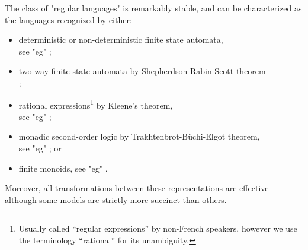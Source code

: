 The class of "regular languages" is remarkably stable, and can be characterized as the 
languages recognized by either:
\begin{itemize}
	\item deterministic or non-deterministic finite state automata,\\
		\null\hspace{1.0pc}see "eg" \cite[Proposition~1.2.3, p.~7]{Pin2021FiniteAutomata};
	\item two-way finite state automata by Shepherdson-Rabin-Scott theorem\\
		\null\hspace{1.0pc}\cite[Theorem~2, p.~198]{Shepherdson1959ReductionTwoWay}
		\cite[Theorem~15, p.~123]{RabinScott1959FiniteAutomata};
	\item rational expressions\footnote{Usually called ``regular expressions'' by
		non-French speakers, however we use the terminology ``rational'' for its unambiguity.}
		by Kleene's theorem,\\
		\null\hspace{1.0pc}see "eg" \cite[Theorem~1.5.11, p.~34]{Pin2021FiniteAutomata};
	\item monadic second-order logic by Trakhtenbrot-Büchi-Elgot theorem,\\
		\null\hspace{1.0pc}see "eg" \cite[Theorem~2.2, p.~32]{Bojanczyk2020MSO}; or
	\item finite monoids, see "eg" \cite[\S~1.4.2, p.~19]{Pin2021FiniteAutomata}.
\end{itemize}
Moreover, all transformations between these representations are effective---although some
models are strictly more succinct than others.

